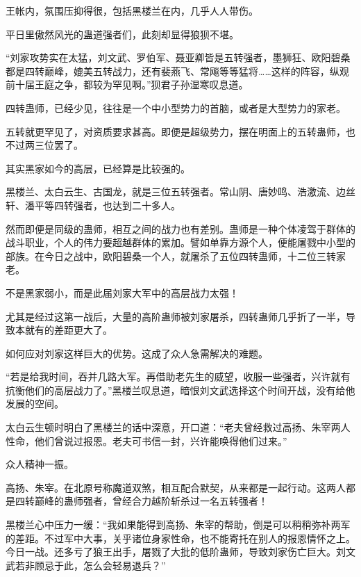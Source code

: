
\begin{this_body}



王帐内，氛围压抑得很，包括黑楼兰在内，几乎人人带伤。

平日里傲然风光的蛊道强者们，此刻却显得狼狈不堪。

“刘家攻势实在太猛，刘文武、罗伯军、聂亚卿皆是五转强者，墨狮狂、欧阳碧桑都是四转巅峰，媲美五转战力，还有裴燕飞、常飚等等猛将……这样的阵容，纵观前十届王庭之争，都较为罕见啊。”狈君子孙湿寒叹息道。

四转蛊师，已经少见，往往是一个中小型势力的首脑，或者是大型势力的家老。

五转就更罕见了，对资质要求甚高。即便是超级势力，摆在明面上的五转蛊师，也不过两三位罢了。

其实黑家如今的高层，已经算是比较强的。

黑楼兰、太白云生、古国龙，就是三位五转强者。常山阴、唐妙鸣、浩激流、边丝轩、潘平等四转强者，也达到二十多人。

然而即便是同级的蛊师，相互之间的战力也有差别。蛊师是一种个体凌驾于群体的战斗职业，个人的伟力要超越群体的累加。譬如单靠方源个人，便能屠戮中小型的部族。在今日之战中，欧阳碧桑一个人，就屠杀了五位四转蛊师，十二位三转家老。

不是黑家弱小，而是此届刘家大军中的高层战力太强！

尤其是经过这第一战后，大量的高阶蛊师被刘家屠杀，四转蛊师几乎折了一半，导致本就有的差距更大了。

如何应对刘家这样巨大的优势。这成了众人急需解决的难题。

“若是给我时间，吞并几路大军。再借助老先生的威望，收服一些强者，兴许就有抗衡他们的高层战力了。”黑楼兰叹息道，暗恨刘文武选择这个时间开战，没有给他发展的空间。

太白云生顿时明白了黑楼兰的话中深意，开口道：“老夫曾经救过高扬、朱宰两人性命，他们曾说过报恩。老夫可书信一封，兴许能唤得他们过来。”

众人精神一振。

高扬、朱宰。在北原号称魔道双煞，相互配合默契，从来都是一起行动。这两人都是四转巅峰的蛊师强者，曾经合力越阶斩杀过一名五转强者！

黑楼兰心中压力一缓：“我如果能得到高扬、朱宰的帮助，倒是可以稍稍弥补两军的差距。不过军中大事，关乎诸位身家性命，也不能寄托在别人的报恩情怀之上。今日一战。还多亏了狼王出手，屠戮了大批的低阶蛊师，导致刘家伤亡巨大。刘文武若非顾忌于此，怎么会轻易退兵？”


\end{this_body}
